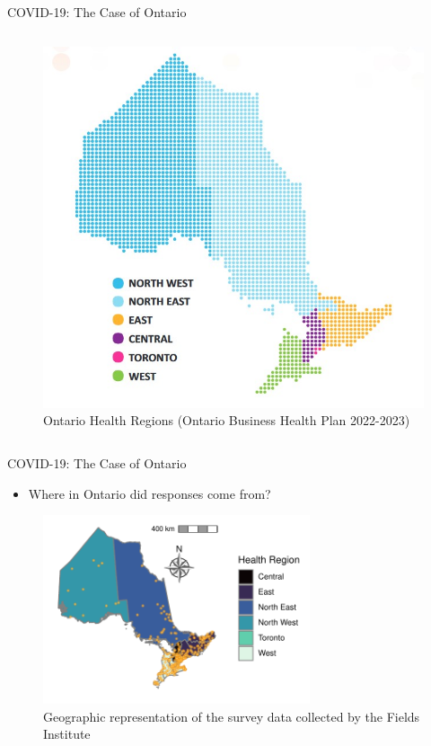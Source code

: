 \documentclass[
  ignorenonframetext,
]{beamer}
\providecommand{\tightlist}{%
  \setlength{\itemsep}{0pt}\setlength{\parskip}{0pt}}\usepackage{longtable,booktabs,array}
\begin{document}
\begin{frame}{COVID-19: The Case of Ontario}
\begin{columns}[T]
\begin{column}{0.5\textwidth}
\begin{figure}
{\centering \includegraphics[width=1\textwidth,height=\textheight]{img/ON_HR_map.jpg}

}

\caption{Ontario Health Regions (Ontario Business Health Plan
2022-2023)}

\end{figure}
\end{column}
\end{columns}
\end{frame}

\begin{frame}{COVID-19: The Case of Ontario}
\protect\hypertarget{covid-19-the-case-of-ontario-7}{}
\begin{itemize}[<+->]
\tightlist
\item
  Where in Ontario did responses come from?
\end{itemize}

\begin{figure}

{\centering \includegraphics[width=0.7\textwidth,height=0.7\textheight]{img/map.pdf}

}

\caption{\label{fig-map}Geographic representation of the survey data
collected by the Fields Institute}

\end{figure}
\end{frame}
\end{document}

